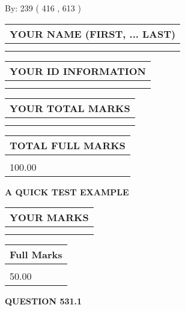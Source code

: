 \documentclass[12pt]{article}
\begin{document}
   
\hspace{1.0in} By: 
 239 ( 416 ,  613 )
   
   
   
   
\newpage 
\setcounter{page}{ 
   531001 } 
   
   
   
   
\noindent\begin{tabular}{|l|}
\hline
YOUR NAME (FIRST, ... LAST)  \\
\hline
 \\ 
 \\ 
\hline
\end{tabular}
\hspace{0.05in} \begin{tabular}{|l|}
\hline
 YOUR   ID   INFORMATION  \\
\hline
 \\ 
 \\ 
\hline
\end{tabular}
   
   
\vspace{0.2in}\noindent\begin{tabular}{|l|}
\hline
YOUR TOTAL MARKS  \\
\hline
 \\ 
 \\ 
\hline
\end{tabular}
\hspace{0.05in} \begin{tabular}{|l|}
\hline
TOTAL FULL MARKS  \\
\hline
 \\ 
100.00 \\
\hline
\end{tabular}
   
   
 \vspace{0.2in}
{\LARGE {\textbf{ A QUICK TEST EXAMPLE}}}
   
   
  
\vspace{0.2in}
  
\noindent\begin{tabular}{|l|}
\hline
 YOUR MARKS  \\
\hline
 \\ 
 \\ 
\hline
\end{tabular}
\hspace{0.05in} \begin{tabular}{|l|}
\hline
 Full Marks  \\
\hline
 \\ 
50.00 \\
\hline
\end{tabular}
{\textbf{\Large{QUESTION
531.1 
}}}
  
\end{document}
